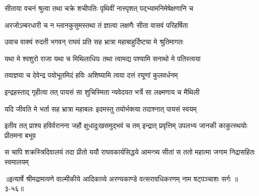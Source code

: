 \twolineshloka
{सीताया वचनं श्रुत्वा तथा चक्रे शचीपतिः}
{पृथिवीं नास्पृशत् पद्भ्यामनिमेषेक्षणानि च} %

\twolineshloka
{अरजोऽम्बरधारी च न म्लानकुसुमस्तथा}
{तं ज्ञात्वा लक्षणैः सीता वासवं परिहर्षिता} %

\twolineshloka
{उवाच वाक्यं रुदती भगवन् राघवं प्रति}
{सह भ्रात्रा महाबाहुर्दिष्ट्या मे श्रुतिमागतः} %

\twolineshloka
{यथा मे श्वशुरो राजा यथा च मिथिलाधिपः}
{तथा त्वामद्य पश्यामि सनाथो मे पतिस्त्वया} %

\twolineshloka
{तवाज्ञया च देवेन्द्र पयोभूतमिदं हविः}
{अशिष्यामि त्वया दत्तं रघूणां कुलवर्धनम्} %

\twolineshloka
{इन्द्रहस्ताद् गृहीत्वा तत् पायसं सा शुचिस्मिता}
{न्यवेदयत भर्त्रे सा लक्ष्मणाय च मैथिली} %

\twolineshloka
{यदि जीवति मे भर्ता सह भ्रात्रा महाबलः}
{इदमस्तु तयोर्भक्त्या तदाश्नात् पायसं स्वयम्} %

\twolineshloka
{इतीव तत् प्राश्य हविर्वरानना जहौ क्षुधादुःखसमुद्भवं च तम्}
{इन्द्रात् प्रवृत्तिम् उपलभ्य जानकी काकुत्स्थयोः प्रीतमना बभूव} %

\twolineshloka
{स चापि शक्रस्त्रिदिवालयं तदा प्रीतो ययौ राघवकार्यसिद्धये}
{आमन्त्र्य सीतां स ततो महात्मा जगाम निद्रासहितः स्वमालयम्} %


॥इत्यार्षे श्रीमद्रामायणे वाल्मीकीये आदिकाव्ये अरण्यकाण्डे वत्सरावधिकरणम् नाम षट्पञ्चाशः सर्गः ॥३-५६॥
